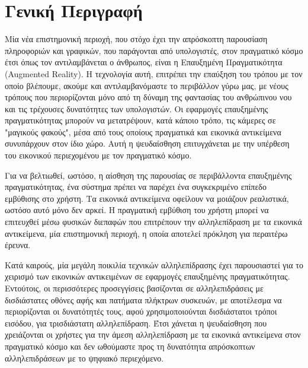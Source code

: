 

 \label{c:intro}


\section{Γενική Περιγραφή}

Μία νέα επιστημονική περιοχή, που στόχο έχει την απρόσκοπτη παρουσίαση πληροφοριών και γραφικών, που παράγονται από υπολογιστές, στον πραγματικό κόσμο έτσι όπως τον αντιλαμβάνεται ο άνθρωπος, είναι η Επαυξημένη Πραγματικότητα (Augmented Reality). 
Η τεχνολογία αυτή, επιτρέπει την επαύξηση του τρόπου με τον οποίο βλέπουμε, ακούμε και αντιλαμβανόμαστε το περιβάλλον γύρω μας, με νέους τρόπους που περιορίζονται μόνο από τη δύναμη της φαντασίας του ανθρώπινου νου και τις τρέχουσες δυνατότητες των υπολογιστών. Οι εφαρμογές επαυξημένης πραγματικότητας μπορούν να μετατρέψουν, κατά κάποιο τρόπο, τις κάμερες σε "μαγικούς φακούς", μέσα από τους οποίους πραγματικά και εικονικά αντικείμενα συνυπάρχουν στον ίδιο χώρο. Αυτή η ψευδαίσθηση επιτυγχάνεται με την υπέρθεση του εικονικού περιεχομένου με τον πραγματικό κόσμο. 

Για να βελτιωθεί, ωστόσο, η αίσθηση της παρουσίας σε περιβάλλοντα επαυξημένης πραγματικότητας, ένα σύστημα πρέπει να παρέχει ένα συγκεκριμένο επίπεδο εμβύθισης στο χρήστη. Τα εικονικά αντικείμενα οφείλουν να μοιάζουν ρεαλιστικά, ωστόσο αυτό μόνο δεν αρκεί. Η πραγματική εμβύθιση του χρήστη μπορεί να επιτευχθεί μέσω φυσικών διεπαφών που επιτρέπουν την αλληλεπίδραση με τα εικονικά αντικείμενα, μία επιστημονική περιοχή, η οποία αποτελεί πρόκληση για περαιτέρω έρευνα.

Κατά καιρούς, μία μεγάλη ποικιλία τεχνικών αλληλεπίδρασης έχει παρουσιαστεί για το χειρισμό των εικονικών αντικειμένων σε εφαρμογές επαυξημένης πραγματικότητας. Εντούτοις, οι περισσότερες προσεγγίσεις βασίζονται σε αλληλεπιδράσεις με δισδιάστατες οθόνες αφής και πατήματα πλήκτρων συσκευών, με αποτέλεσμα να περιορίζονται οι δυνατότητές τους, αφού χρησιμοποιούνται δισδιάστατοι τρόποι εισόδου, για τρισδιάστατη αλληλεπίδραση. Έτσι χάνεται η ψευδαίσθηση που χρειάζονται οι χρήστες για την άμεση αλληλεπίδραση με τα εικονικά αντικείμενα στον πραγματικό κόσμο και δεν ωθούμαστε προς τη δυνατότητα απρόσκοπτων αλληλεπιδράσεων με το ψηφιακό περιεχόμενο.


